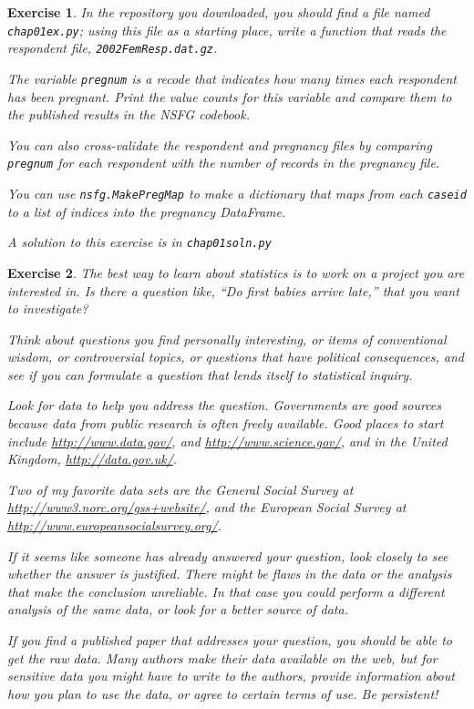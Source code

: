 \documentclass[12pt]{book}
\theoremstyle{exercise}
\newtheorem{exercise}{Exercise}[chapter]
\begin{document}
\begin{exercise}
In the repository you downloaded, you should find a file named
\verb"chap01ex.py"; using this file as a starting place, write a
function that reads the respondent file, {\tt 2002FemResp.dat.gz}.

The variable {\tt pregnum} is a recode that indicates how many
times each respondent has been pregnant.  Print the value counts
for this variable and compare them to the published results in
the NSFG codebook.

You can also cross-validate the respondent and pregnancy files by
comparing {\tt pregnum} for each respondent with the number of
records in the pregnancy file.

You can use {\tt nsfg.MakePregMap} to make a dictionary that maps
from each {\tt caseid} to a list of indices into the pregnancy
DataFrame.%

A solution to this exercise is in \verb"chap01soln.py"
\end{exercise}


\begin{exercise}
The best way to learn about statistics is to work on a project you are
interested in.  Is there a question like, ``Do first babies arrive
late,'' that you want to investigate?

Think about questions you find personally interesting, or items of
conventional wisdom, or controversial topics, or questions that have
political consequences, and see if you can formulate a question that
lends itself to statistical inquiry.

Look for data to help you address the question.  Governments are good
sources because data from public research is often freely
available.  Good places to start include \url{http://www.data.gov/},
and \url{http://www.science.gov/}, and in the United Kingdom,
\url{http://data.gov.uk/}.

Two of my favorite data sets are the General Social Survey at
\url{http://www3.norc.org/gss+website/}, and the European Social
Survey at \url{http://www.europeansocialsurvey.org/}.

If it seems like someone has already answered your question, look
closely to see whether the answer is justified.  There might be flaws
in the data or the analysis that make the conclusion unreliable.  In
that case you could perform a different analysis of the same data, or
look for a better source of data.

If you find a published paper that addresses your question, you
should be able to get the raw data.  Many authors make their data
available on the web, but for sensitive data you might have to
write to the authors, provide information about how you plan to use
the data, or agree to certain terms of use.  Be persistent!

\end{exercise}
\end{document}
